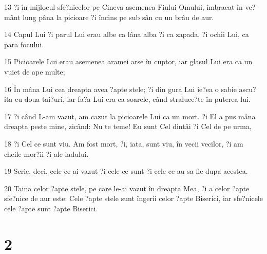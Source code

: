 \par 13 ?i în mijlocul sfe?nicelor pe Cineva asemenea Fiului Omului, îmbracat în ve?mânt lung pâna la picioare ?i încins pe sub sân cu un brâu de aur.
\par 14 Capul Lui ?i parul Lui erau albe ca lâna alba ?i ca zapada, ?i ochii Lui, ca para focului.
\par 15 Picioarele Lui erau asemenea aramei arse în cuptor, iar glasul Lui era ca un vuiet de ape multe;
\par 16 În mâna Lui cea dreapta avea ?apte stele; ?i din gura Lui ie?ea o sabie ascu?ita cu doua tai?uri, iar fa?a Lui era ca soarele, când straluce?te în puterea lui.
\par 17 ?i când L-am vazut, am cazut la picioarele Lui ca un mort. ?i El a pus mâna dreapta peste mine, zicând: Nu te teme! Eu sunt Cel dintâi ?i Cel de pe urma,
\par 18 ?i Cel ce sunt viu. Am fost mort, ?i, iata, sunt viu, în vecii vecilor, ?i am cheile mor?ii ?i ale iadului.
\par 19 Scrie, deci, cele ce ai vazut ?i cele ce sunt ?i cele ce au sa fie dupa acestea.
\par 20 Taina celor ?apte stele, pe care le-ai vazut în dreapta Mea, ?i a celor ?apte sfe?nice de aur este: Cele ?apte stele sunt îngerii celor ?apte Biserici, iar sfe?nicele cele ?apte sunt ?apte Biserici.

\chapter{2}

